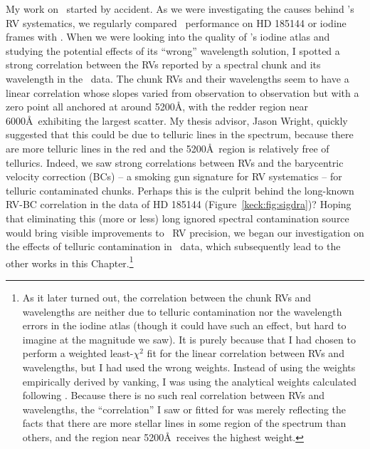 My work on \keck\ started by accident. As we were investigating the
causes behind \het's RV systematics, we regularly compared \keck\
performance on HD 185144 or iodine frames with \het. When we were
looking into the quality of \het's iodine atlas and studying the
potential effects of its ``wrong'' wavelength solution, I spotted a
strong correlation between the RVs reported by a spectral chunk and
its wavelength in the \keck\ data. The chunk RVs and their wavelengths
seem to have a linear correlation whose slopes varied from observation
to observation but with a zero point all anchored at around 5200\AA,
with the redder region near 6000\AA\ exhibiting the largest
scatter. My thesis advisor, Jason Wright, quickly suggested that this
could be due to telluric lines in the spectrum, because there are more
telluric lines in the red and the 5200\AA\ region is relatively free
of tellurics. Indeed, we saw strong correlations between RVs and the
barycentric velocity correction (BCs) -- a smoking gun signature for
RV systematics -- for telluric contaminated chunks. Perhaps this is
the culprit behind the long-known RV-BC correlation in the data of HD
185144 (Figure~\ref{keck:fig:sigdra})? Hoping that eliminating this
(more or less) long ignored spectral contamination source would bring
visible improvements to \keck\ RV precision, we began our
investigation on the effects of telluric contamination in \keck\ data,
which subsequently lead to the other works in this
Chapter.\footnote{As it later turned out, the correlation between the
chunk RVs and wavelengths are neither due to telluric contamination
nor the wavelength errors in the iodine atlas (though it could have
such an effect, but hard to imagine at the magnitude we saw). It is
purely because that I had chosen to perform a weighted least-$\chi^2$
fit for the linear correlation between RVs and wavelengths, but I had
used the wrong weights. Instead of using the weights empirically
derived by vanking, I was using the analytical weights calculated
following \cite{butler1996}. Because there is no such real
correlation between RVs and wavelengths, the ``correlation'' I saw or
fitted for was merely reflecting the facts that there are more stellar
lines in some region of the spectrum than others, and the region near
5200\AA\ receives the highest weight.}
 
